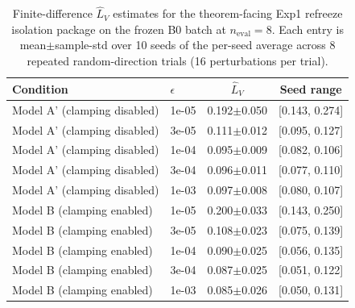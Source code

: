 \begin{table}[t]
\centering
\caption{Finite-difference $\hat L_V$ estimates for the theorem-facing Exp1 refreeze isolation package on the frozen B0 batch at $n_{\mathrm{eval}}{=}8$. Each entry is mean$\pm$sample-std over 10 seeds of the per-seed average across 8 repeated random-direction trials (16 perturbations per trial).}
\label{tab:exp1_value_head_lipschitz}
\begin{tabular}{llcc}
\toprule
Condition & $\epsilon$ & $\hat L_V$ & Seed range \\
\midrule
  Model A' (clamping disabled) & 1e-05 & 0.192$\pm$0.050 & [0.143, 0.274] \\
  Model A' (clamping disabled) & 3e-05 & 0.111$\pm$0.012 & [0.095, 0.127] \\
  Model A' (clamping disabled) & 1e-04 & 0.095$\pm$0.009 & [0.082, 0.106] \\
  Model A' (clamping disabled) & 3e-04 & 0.096$\pm$0.011 & [0.077, 0.110] \\
  Model A' (clamping disabled) & 1e-03 & 0.097$\pm$0.008 & [0.080, 0.107] \\
  Model B (clamping enabled) & 1e-05 & 0.200$\pm$0.033 & [0.143, 0.250] \\
  Model B (clamping enabled) & 3e-05 & 0.108$\pm$0.023 & [0.075, 0.139] \\
  Model B (clamping enabled) & 1e-04 & 0.090$\pm$0.025 & [0.056, 0.135] \\
  Model B (clamping enabled) & 3e-04 & 0.087$\pm$0.025 & [0.051, 0.122] \\
  Model B (clamping enabled) & 1e-03 & 0.085$\pm$0.026 & [0.050, 0.131] \\
\bottomrule
\end{tabular}
\end{table}

